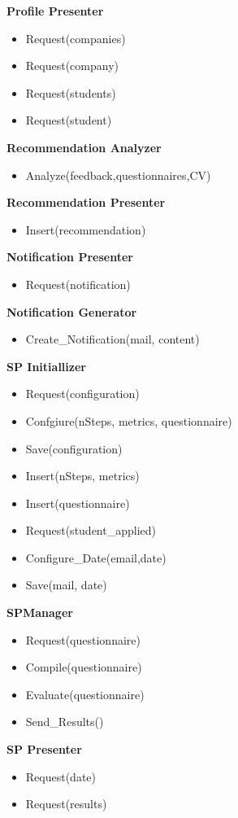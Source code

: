 		\textbf{Profile Presenter}
		\begin{itemize}
			\item Request(companies)
			\item Request(company)
			\item Request(students)
			\item Request(student)
		\end{itemize}
		
		\textbf{Recommendation Analyzer}
		\begin{itemize}
			\item Analyze(feedback,questionnaires,CV)
		\end{itemize}
		\textbf{Recommendation Presenter}
		\begin{itemize}
			\item Insert(recommendation)
		\end{itemize}
		
		\textbf{Notification Presenter}
		\begin{itemize}
			\item Request(notification)
		\end{itemize}
		
		\textbf{Notification Generator}
		\begin{itemize}
			\item Create\_Notification(mail, content)
			
		\end{itemize}
		
		\textbf{SP Initiallizer}
		\begin{itemize}
			\item Request(configuration)
			\item Confgiure(nSteps, metrics, questionnaire)
			\item Save(configuration)
			\item Insert(nSteps, metrics)
			\item Insert(questionnaire)
			\item Request(student\_applied)
			\item Configure\_Date(email,date)
			\item Save(mail, date)
		\end{itemize}
		
		\textbf{SPManager}
		\begin{itemize}
			\item Request(questionnaire)
			\item Compile(questionnaire)
			\item Evaluate(questionnaire)
			\item Send\_Results()
			
		\end{itemize}
		\textbf{SP Presenter}
		\begin{itemize}
			\item Request(date)
			\item Request(results)
		\end{itemize}
		
